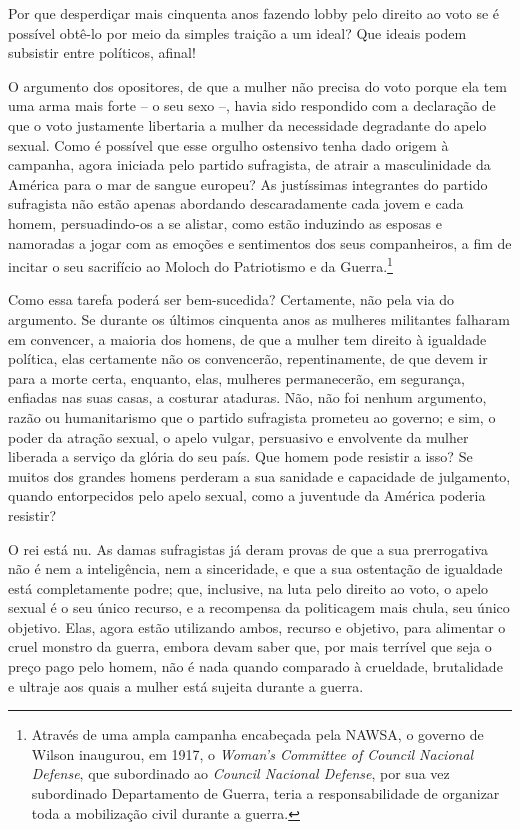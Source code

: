 Por que desperdiçar mais cinquenta anos fazendo lobby pelo direito ao
voto se é possível obtê-lo por meio da simples traição a um ideal? Que
ideais podem subsistir entre políticos, afinal!

O argumento dos opositores, de que a mulher não precisa do voto porque
ela tem uma arma mais forte -- o seu sexo --, havia sido respondido com
a declaração de que o voto justamente libertaria a mulher da necessidade
degradante do apelo sexual. Como é possível que esse orgulho ostensivo
tenha dado origem à campanha, agora iniciada pelo partido sufragista, de
atrair a masculinidade da América para o mar de sangue europeu? As
justíssimas integrantes do partido sufragista não estão apenas abordando
descaradamente cada jovem e cada homem, persuadindo-os a se alistar,
como estão induzindo as esposas e namoradas a jogar com as emoções e
sentimentos dos seus companheiros, a fim de incitar o seu sacrifício ao
Moloch do Patriotismo e da Guerra.\footnote{Através de uma ampla
  campanha encabeçada pela NAWSA, o governo de Wilson inaugurou, em
  1917, o \emph{Woman's Committee of Council Nacional Defense}, que
  subordinado ao \emph{Council Nacional Defense}, por sua vez
  subordinado Departamento de Guerra, teria a responsabilidade de
  organizar toda a mobilização civil durante a guerra.}

Como essa tarefa poderá ser bem-sucedida? Certamente, não pela via do
argumento. Se durante os últimos cinquenta anos as mulheres militantes
falharam em convencer, a maioria dos homens, de que a mulher tem direito
à igualdade política, elas certamente não os convencerão,
repentinamente, de que devem ir para a morte certa, enquanto, elas,
mulheres permanecerão, em segurança, enfiadas nas suas casas, a costurar
ataduras. Não, não foi nenhum argumento, razão ou humanitarismo que o
partido sufragista prometeu ao governo; e sim, o poder da atração
sexual, o apelo vulgar, persuasivo e envolvente da mulher liberada a
serviço da glória do seu país. Que homem pode resistir a isso? Se muitos
dos grandes homens perderam a sua sanidade e capacidade de julgamento,
quando entorpecidos pelo apelo sexual, como a juventude da América
poderia resistir?

O rei está nu. As damas sufragistas já deram provas de que a sua
prerrogativa não é nem a inteligência, nem a sinceridade, e que a sua
ostentação de igualdade está completamente podre; que, inclusive, na
luta pelo direito ao voto, o apelo sexual é o seu único recurso, e a
recompensa da politicagem mais chula, seu único objetivo. Elas, agora
estão utilizando ambos, recurso e objetivo, para alimentar o cruel
monstro da guerra, embora devam saber que, por mais terrível que seja o
preço pago pelo homem, não é nada quando comparado à crueldade,
brutalidade e ultraje aos quais a mulher está sujeita durante a guerra.

